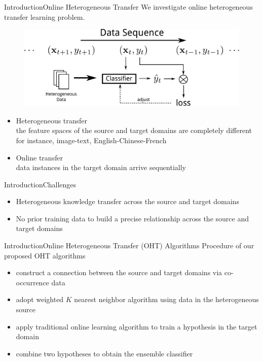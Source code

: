 \documentclass{beamer}
\begin{document}
\begin{frame}{Introduction}{Online Heterogeneous Transfer}
We investigate online heterogeneous transfer learning problem.
\begin{figure}
\centering
\includegraphics[height=0.25\textwidth]{problem.pdf}
\end{figure}
\begin{itemize}
\item
Heterogeneous transfer
\\
the feature spaces of the source and target domains are completely different
\\
for instance, image-text, English-Chinese-French
\item
Online transfer
\\
data instances in the target domain arrive sequentially
\end{itemize}
\end{frame}

\begin{frame}{Introduction}{Challenges}
\begin{itemize}
\item
Heterogeneous knowledge transfer across the source and target domains
\item
No prior training data to build a precise relationship across the source and target domains
\end{itemize}
\end{frame}

\begin{frame}{Introduction}{Online Heterogeneous Transfer (OHT) Algorithms}
Procedure of our proposed OHT algorithms
\begin{itemize}
\item
construct a connection between the source and target domains via co-occurrence data
\item
adopt weighted $K$ nearest neighbor algorithm using data in the heterogeneous source
\item
apply traditional online learning algorithm to train a hypothesis in the target domain 
\item
combine two hypotheses to obtain the ensemble classifier
\end{itemize}
\end{frame}
\end{document}
